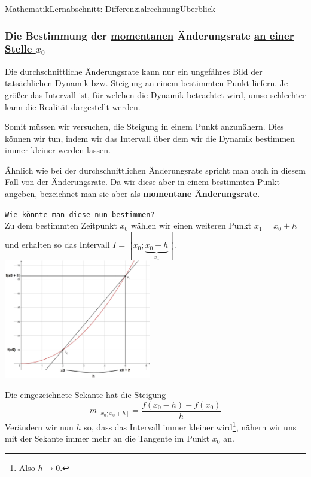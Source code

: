 \documentclass[11pt,twocolumn,oneside,openany,headings=optiontotoc,11pt,numbers=noenddot,final]{article}
\begin{document}
\begin{worksheet}{Mathematik}{Lernabschnitt: Differenzialrechnung}{Überblick}
		\subsubsection*{Die Bestimmung der \underline{momentanen} Änderungsrate \underline{an einer Stelle \(x_0\)}}
		Die durchschnittliche Änderungsrate kann nur ein ungefähres Bild der tatsächlichen Dynamik bzw. Steigung an einem bestimmten Punkt liefern. Je größer das Intervall ist, für welchen die Dynamik betrachtet wird, umso schlechter kann die Realität dargestellt werden.\\
		\par\noindent
		Somit müssen wir versuchen, die Steigung in einem Punkt anzunähern. Dies können wir tun, indem wir das Intervall über dem wir die Dynamik bestimmen immer kleiner werden lassen.\\
		\par\noindent
		Ähnlich wie bei der durchschnittlichen Änderungsrate spricht man auch in diesem Fall von der Änderungsrate. Da wir diese aber in einem bestimmten Punkt angeben, bezeichnet man sie aber als \textbf{momentane Änderungsrate}.\\
		\par\noindent
		\texttt{Wie könnte man diese nun bestimmen?}\\
		Zu dem bestimmten Zeitpunkt \(x_0\) wählen wir einen weiteren Punkt \(x_1 = x_0 + h\) und erhalten so das Intervall \(I = [x_0; \underbrace{x_0 + h}_{x_1}]\).\\
		\includegraphics[width=0.48\textwidth]{../99_Bilder/04_Skr_DiffQuo.jpg}\\
		\par\noindent
		Die eingezeichnete Sekante hat die Steigung
		\[m_{[x_0;x_0+h]} = \frac{f(x_0-h) - f(x_0)}{h}\]
		Verändern wir nun \(h\) so, dass das Intervall immer kleiner wird\footnote{Also \(h\rightarrow{}0\).}, nähern wir uns mit der Sekante immer mehr an die Tangente im Punkt \(x_0\) an.
	\end{worksheet}
\end{document}
